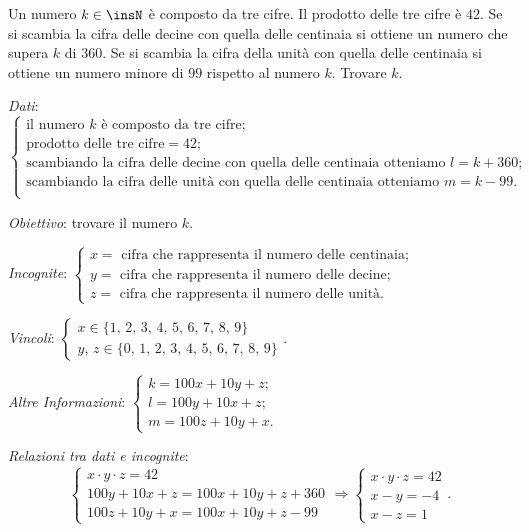 \begin{problema}
Un numero $k\in \insN$ è composto da tre cifre. Il prodotto delle tre cifre è $42$. Se si scambia la cifra delle decine con quella delle centinaia si ottiene un numero che supera $k$ di $360$. Se si scambia la cifra della unità con quella delle centinaia si ottiene un numero minore di $99$ rispetto al numero $k$. Trovare $k$.
\end{problema}

\emph{Dati}: $\left\{\begin{array}{l}
\text{il numero } k \text{ è composto da tre cifre};\\
\text{prodotto delle tre cifre} = 42;\\
\text{scambiando la cifra delle decine con quella delle centinaia otteniamo }l=k+360; \\
\text{scambiando la cifra delle unità con quella delle centinaia otteniamo }m=k-99.\\
\end{array}\right.$

\emph{Obiettivo}: trovare il numero $k$.

\emph{Incognite}: $\left\{\begin{array}{l}
x=\text{ cifra che rappresenta il numero delle centinaia;}\\
y=\text{ cifra che rappresenta il numero delle decine;}\\
z=\text{ cifra che rappresenta il numero delle unità.}
\end{array}\right.$

\emph{Vincoli}: $\left\{\begin{array}{l}x\in \{1\text{, }2\text{, }3\text{, }4\text{, }5\text{, }6\text{, }7\text{, }8\text{, }9\} \\y\text{, }z\in \{0\text{, }1\text{, }2\text{, }3\text{, }4\text{, }5\text{, }6\text{, }7\text{, }8\text{, }9\}\end{array}\right.$.

\emph{Altre Informazioni}: $\left\{\begin{array}{l}
k=100x+10y+z;\\
l=100y+10x+z;\\
m=100z+10y+x.
\end{array}\right.$

\emph{Relazioni tra dati e incognite}: \[ \left\{\begin{array}{l}x\cdot y\cdot z=42 \\100y+10x+z=100x+10y+z+360\\100z+10y+x=100x+10y+z-99 \end{array}\right.\Rightarrow \left\{\begin{array}{l}x\cdot y\cdot z=42 \\x-y=-4\\x-z=1\end{array}\right.. \]

